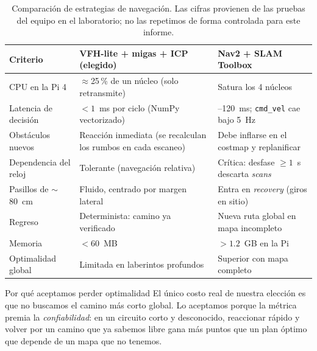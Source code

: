 \documentclass[11pt,a4paper]{article}
\newcommand{\cmd}[1]{\texttt{\small #1}}
\begin{document}
\begin{table}[H]
\centering\small
\begin{tabularx}{\textwidth}{@{}>{\raggedright\arraybackslash}p{3.0cm}>{\raggedright\arraybackslash}X>{\raggedright\arraybackslash}X@{}}
\toprule
\textbf{Criterio} & \textbf{VFH-lite + migas + ICP (elegido)} & \textbf{Nav2 + SLAM Toolbox} \\
\midrule
CPU en la Pi 4 & $\approx$25\,\% de un n\'ucleo (solo retransmite) & Satura los 4 n\'ucleos \\
Latencia de decisi\'on & $<1$~ms por ciclo (NumPy vectorizado) & 40--120~ms; \cmd{cmd\_vel} cae bajo 5~Hz \\
Obst\'aculos nuevos & Reacci\'on inmediata (se recalculan los rumbos en cada escaneo) & Debe inflarse en el costmap y replanificar \\
Dependencia del reloj & Tolerante (navegaci\'on relativa) & Cr\'itica: desfase $\ge1$~s descarta \emph{scans} \\
Pasillos de $\sim$80~cm & Fluido, centrado por margen lateral & Entra en \emph{recovery} (giros en sitio) \\
Regreso & Determinista: camino ya verificado & Nueva ruta global en mapa incompleto \\
Memoria & $<60$~MB & $>1.2$~GB en la Pi \\
Optimalidad global & Limitada en laberintos profundos & Superior con mapa completo \\
\bottomrule
\end{tabularx}
\caption{Comparaci\'on de estrategias de navegaci\'on. Las cifras provienen de las pruebas del equipo en el laboratorio; no las repetimos de forma controlada para este informe.}
\label{tab:nav}
\end{table}

\begin{decision}{Por qu\'e aceptamos perder optimalidad}
El \'unico costo real de nuestra elecci\'on es que no buscamos el camino m\'as corto global. Lo aceptamos porque la m\'etrica premia la \emph{confiabilidad}: en un circuito corto y
desconocido, reaccionar r\'apido y volver por un camino que ya sabemos libre gana m\'as puntos que un plan \'optimo que depende de un mapa que no tenemos.
\end{decision}
\end{document}
